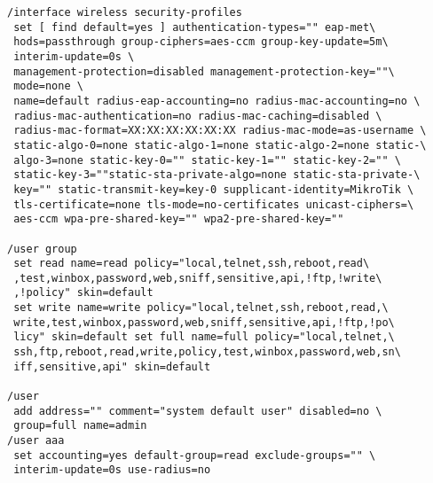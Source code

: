 \begin{verbatim}
/interface wireless security-profiles
 set [ find default=yes ] authentication-types="" eap-met\
 hods=passthrough group-ciphers=aes-ccm group-key-update=5m\
 interim-update=0s \
 management-protection=disabled management-protection-key=""\
 mode=none \
 name=default radius-eap-accounting=no radius-mac-accounting=no \
 radius-mac-authentication=no radius-mac-caching=disabled \
 radius-mac-format=XX:XX:XX:XX:XX:XX radius-mac-mode=as-username \
 static-algo-0=none static-algo-1=none static-algo-2=none static-\
 algo-3=none static-key-0="" static-key-1="" static-key-2="" \
 static-key-3=""static-sta-private-algo=none static-sta-private-\
 key="" static-transmit-key=key-0 supplicant-identity=MikroTik \
 tls-certificate=none tls-mode=no-certificates unicast-ciphers=\
 aes-ccm wpa-pre-shared-key="" wpa2-pre-shared-key=""

/user group
 set read name=read policy="local,telnet,ssh,reboot,read\
 ,test,winbox,password,web,sniff,sensitive,api,!ftp,!write\
 ,!policy" skin=default
 set write name=write policy="local,telnet,ssh,reboot,read,\
 write,test,winbox,password,web,sniff,sensitive,api,!ftp,!po\
 licy" skin=default set full name=full policy="local,telnet,\
 ssh,ftp,reboot,read,write,policy,test,winbox,password,web,sn\
 iff,sensitive,api" skin=default
 
/user
 add address="" comment="system default user" disabled=no \
 group=full name=admin
/user aaa
 set accounting=yes default-group=read exclude-groups="" \
 interim-update=0s use-radius=no


\end{verbatim}
